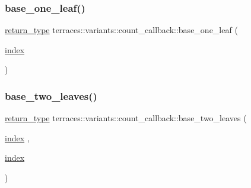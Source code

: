 \mbox{\label{classterraces_1_1variants_1_1count__callback_a286a391ba17a1e6e0b2d3d5294c7a4f8}} 
\subsubsection{\texorpdfstring{base\+\_\+one\+\_\+leaf()}{base\_one\_leaf()}}
{\footnotesize\ttfamily \hyperlink{classterraces_1_1variants_1_1count__callback_adb8cc586b7f8d5aeaa4d1d83c36c5cb8}{return\+\_\+type} terraces\+::variants\+::count\+\_\+callback\+::base\+\_\+one\+\_\+leaf (\begin{DoxyParamCaption}\item[{\hyperlink{namespaceterraces_adbc33ccb543d1634e96d0eb02e472c77}{index}}]{ }\end{DoxyParamCaption})\hspace{0.3cm}{\ttfamily [inline]}}

\mbox{\label{classterraces_1_1variants_1_1count__callback_a4964310381cb80333c4211544a9d91e0}} 
\subsubsection{\texorpdfstring{base\+\_\+two\+\_\+leaves()}{base\_two\_leaves()}}
{\footnotesize\ttfamily \hyperlink{classterraces_1_1variants_1_1count__callback_adb8cc586b7f8d5aeaa4d1d83c36c5cb8}{return\+\_\+type} terraces\+::variants\+::count\+\_\+callback\+::base\+\_\+two\+\_\+leaves (\begin{DoxyParamCaption}\item[{\hyperlink{namespaceterraces_adbc33ccb543d1634e96d0eb02e472c77}{index}}]{,  }\item[{\hyperlink{namespaceterraces_adbc33ccb543d1634e96d0eb02e472c77}{index}}]{ }\end{DoxyParamCaption})\hspace{0.3cm}{\ttfamily [inline]}}

